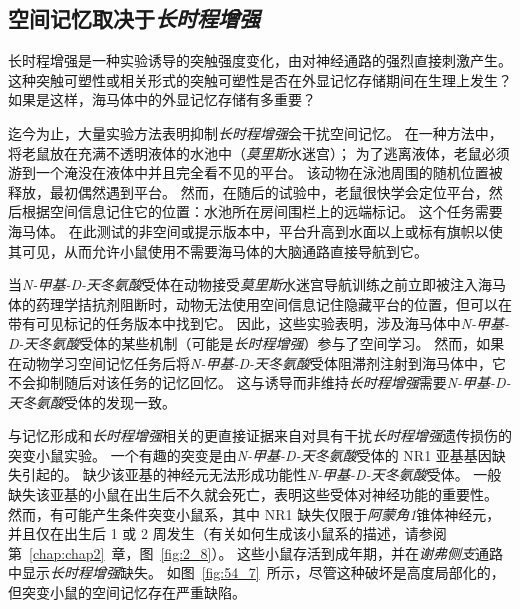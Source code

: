 \subsection{空间记忆取决于\textit{长时程增强}}

长时程增强是一种实验诱导的突触强度变化，由对神经通路的强烈直接刺激产生。
这种突触可塑性或相关形式的突触可塑性是否在外显记忆存储期间在生理上发生？
如果是这样，海马体中的外显记忆存储有多重要？


迄今为止，大量实验方法表明抑制\textit{长时程增强}会干扰空间记忆。
在一种方法中，将老鼠放在充满不透明液体的水池中（\textit{莫里斯}水迷宫）；
为了逃离液体，老鼠必须游到一个淹没在液体中并且完全看不见的平台。
该动物在泳池周围的随机位置被释放，最初偶然遇到平台。
然而，在随后的试验中，老鼠很快学会定位平台，然后根据空间信息记住它的位置：水池所在房间围栏上的远端标记。
这个任务需要海马体。
在此测试的非空间或提示版本中，平台升高到水面以上或标有旗帜以使其可见，从而允许小鼠使用不需要海马体的大脑通路直接导航到它。


当\textit{N-甲基-D-天冬氨酸}受体在动物接受\textit{莫里斯}水迷宫导航训练之前立即被注入海马体的药理学拮抗剂阻断时，动物无法使用空间信息记住隐藏平台的位置，但可以在带有可见标记的任务版本中找到它。
因此，这些实验表明，涉及海马体中\textit{N-甲基-D-天冬氨酸}受体的某些机制（可能是\textit{长时程增强}）参与了空间学习。
然而，如果在动物学习空间记忆任务后将\textit{N-甲基-D-天冬氨酸}受体阻滞剂注射到海马体中，它不会抑制随后对该任务的记忆回忆。
这与诱导而非维持\textit{长时程增强}需要\textit{N-甲基-D-天冬氨酸}受体的发现一致。


与记忆形成和\textit{长时程增强}相关的更直接证据来自对具有干扰\textit{长时程增强}遗传损伤的突变小鼠实验。
一个有趣的突变是由\textit{N-甲基-D-天冬氨酸}受体的 NR1 亚基基因缺失引起的。
缺少该亚基的神经元无法形成功能性\textit{N-甲基-D-天冬氨酸}受体。
一般缺失该亚基的小鼠在出生后不久就会死亡，表明这些受体对神经功能的重要性。
然而，有可能产生条件突变小鼠系，其中 NR1 缺失仅限于\textit{阿蒙角1}锥体神经元，并且仅在出生后 1 或 2 周发生（有关如何生成该小鼠系的描述，请参阅第~\ref{chap:chap2}~章，图~\ref{fig:2_8}）。
这些小鼠存活到成年期，并在\textit{谢弗侧支}通路中显示\textit{长时程增强}缺失。
如图~\ref{fig:54_7}~所示，尽管这种破坏是高度局部化的，但突变小鼠的空间记忆存在严重缺陷。


